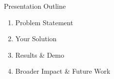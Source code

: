 \begin{frame}{Presentation Outline}
  \begin{enumerate}
    \item Problem Statement
    \item Your Solution
    \item Results \& Demo
    \item Broader Impact \& Future Work
  \end{enumerate}
\end{frame}
